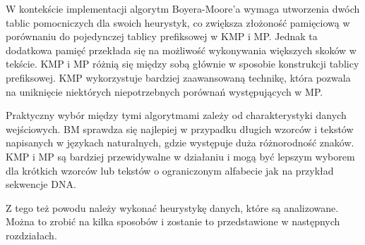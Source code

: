 W kontekście implementacji algorytm Boyera-Moore'a wymaga utworzenia dwóch tablic pomocniczych dla
swoich heurystyk, co zwiększa złożoność pamięciową w porównaniu do pojedynczej 
tablicy prefiksowej w KMP i MP. Jednak ta dodatkowa pamięć przekłada się na 
możliwość wykonywania większych skoków w tekście. KMP i MP różnią się między 
sobą głównie w sposobie konstrukcji tablicy prefiksowej. KMP wykorzystuje 
bardziej zaawansowaną technikę, która pozwala na uniknięcie niektórych 
niepotrzebnych porównań występujących w MP.

Praktyczny wybór między tymi algorytmami zależy od charakterystyki danych
wejściowych. BM sprawdza się najlepiej w przypadku długich wzorców i tekstów
napisanych w językach naturalnych, gdzie występuje duża różnorodność znaków.
KMP i MP są bardziej przewidywalne w działaniu i mogą być lepszym wyborem dla 
krótkich wzorców lub tekstów o ograniczonym alfabecie jak na przykład sekwencje
DNA.

Z tego też powodu należy wykonać heurystykę danych, które są analizowane.
Można to zrobić na kilka sposobów i zostanie to przedstawione w następnych rozdziałach.
